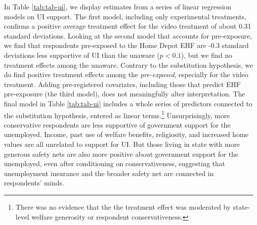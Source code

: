 \documentclass[
  11pt,
  oneside]{article}
\begin{document}
In Table \ref{tab:tab-ui}, we display estimates from a series of linear regression models on UI support. The first model, including only experimental treatments, confirms a positive average treatment effect for the video treatment of about 0.31 standard deviations. Looking at the second model that accounts for pre-exposure, we find that respondents pre-exposed to the Home Depot EHF are -0.3 standard deviations less supportive of UI than the unaware (\(p<0.1\)), but we find no treatment effects among the unaware. Contrary to the substitution hypothesis, we do find positive treatment effects among the \emph{pre-exposed}, especially for the video treatment. Adding pre-registered covariates, including those that predict EHF pre-exposure (the third model), does not meaningfully alter interpretation. The final model in Table \ref{tab:tab-ui} includes a whole series of predictors connected to the substitution hypothesis, entered as linear terms.\footnote{There was no evidence that the the treatment effect was moderated by state-level welfare generosity or respondent conservativeness.} Unsurprisingly, more conservative respondents are less supportive of government support for the unemployed. Income, past use of welfare benefits, religiosity, and increased home values are all unrelated to support for UI. But those living in state with more generous safety nets are also more positive about government support for the unemployed, even after conditioning on conservativeness, suggesting that unemployment insurance and the broader safety net are connected in respondents' minds.
\end{document}

